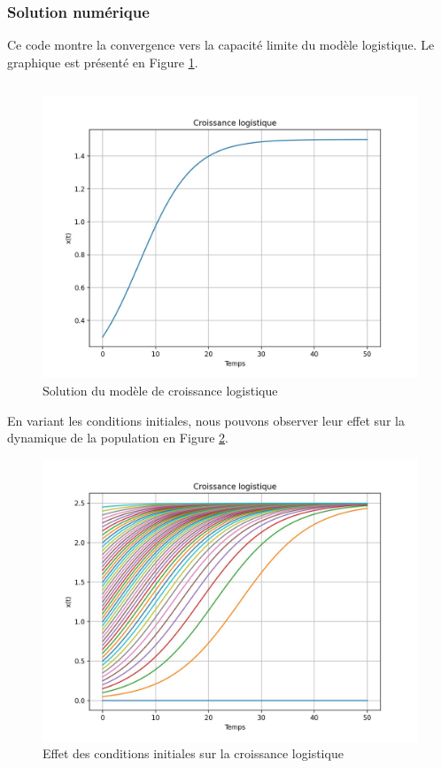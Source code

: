             \subsubsection{Solution numérique}
                Ce code montre la convergence vers la capacité limite du modèle logistique. Le graphique est présenté en Figure \ref{fig:logistique}.
                \inputminted{python}{codes/logistique.py}
                \begin{figure}[ht!]
                    \centering
                    \includegraphics[width=\textwidth]{images/logistique.jpg}
                    \caption{Solution du modèle de croissance logistique}
                    \label{fig:logistique}
                \end{figure}
                
                En variant les conditions initiales, nous pouvons observer leur effet sur la dynamique de la population en Figure \ref{fig:logistique2}.
                \begin{figure}[ht!]
                    \centering
                    \includegraphics[width=\textwidth]{images/logistique2.jpg}
                    \caption{Effet des conditions initiales sur la croissance logistique}
                    \label{fig:logistique2}
                \end{figure}
